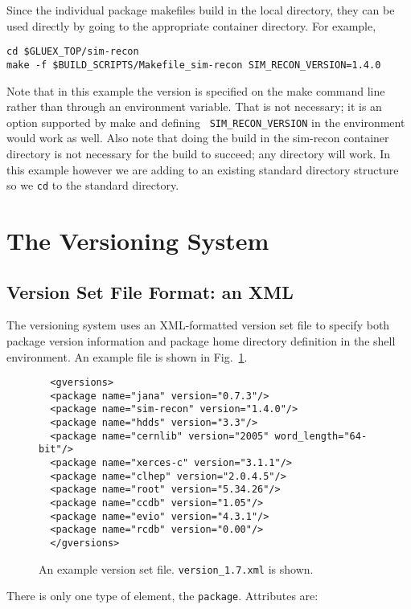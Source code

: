 \documentclass[12pt]{article}
\begin{document}
Since the individual package makefiles build in the local directory,
they can be used directly by going to the appropriate container
directory. For example,
\begin{verbatim}
cd $GLUEX_TOP/sim-recon
make -f $BUILD_SCRIPTS/Makefile_sim-recon SIM_RECON_VERSION=1.4.0
\end{verbatim}
Note that in this example the version is specified on the make command
line rather than through an environment variable. That is not
necessary; it is an option supported by make and defining {\tt
  SIM\_RECON\_VERSION} in the environment would work as well. Also
note that doing the build in the sim-recon container directory is not
necessary for the build to succeed; any directory will work. In this
example however we are adding to an existing standard directory
structure so we {\tt cd} to the standard directory.

\section{The Versioning System}\label{section:versioning}

\subsection{Version Set File Format: an XML}

The versioning system uses an XML-formatted version set file to specify
both package version information and package home directory definition
in the shell environment. An example file is shown in
Fig.~\ref{figure:version-xml}.

\begin{figure}
\begin{verbatim}
  <gversions>
  <package name="jana" version="0.7.3"/>
  <package name="sim-recon" version="1.4.0"/>
  <package name="hdds" version="3.3"/>
  <package name="cernlib" version="2005" word_length="64-bit"/>
  <package name="xerces-c" version="3.1.1"/>
  <package name="clhep" version="2.0.4.5"/>
  <package name="root" version="5.34.26"/>
  <package name="ccdb" version="1.05"/>
  <package name="evio" version="4.3.1"/>
  <package name="rcdb" version="0.00"/>
  </gversions>
\end{verbatim}
\caption{An example version set file. {\tt version\_1.7.xml} is shown.}\label{figure:version-xml}
\end{figure}

There is only one type of element, the {\tt package}. Attributes are:
\end{document}
